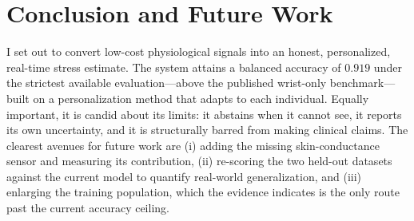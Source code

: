 \documentclass[11pt,a4paper]{article}
\begin{document}
\section{Conclusion and Future Work}

I set out to convert low-cost physiological signals into an honest, personalized, real-time stress
estimate. The system attains a balanced accuracy of $0.919$ under the strictest available
evaluation---above the published wrist-only benchmark---built on a personalization method that adapts
to each individual. Equally important, it is candid about its limits: it abstains when it cannot see,
it reports its own uncertainty, and it is structurally barred from making clinical claims. The
clearest avenues for future work are (i) adding the missing skin-conductance sensor and measuring its
contribution, (ii) re-scoring the two held-out datasets against the current model to quantify
real-world generalization, and (iii) enlarging the training population, which the evidence indicates
is the only route past the current accuracy ceiling.
\end{document}
